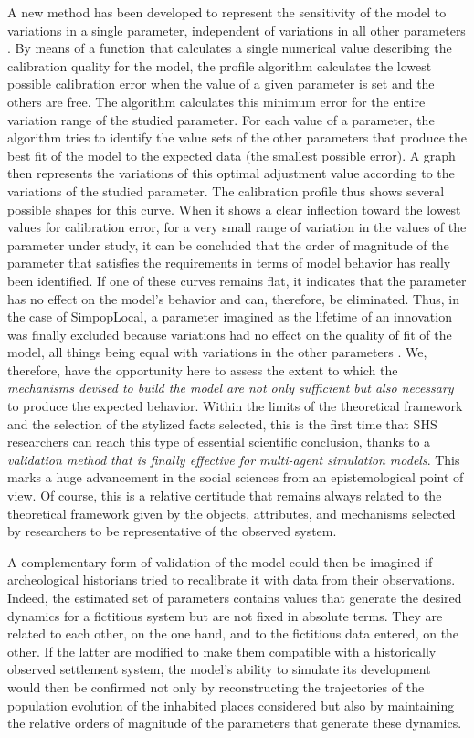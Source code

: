 \documentclass[10pt]{article}
\begin{document}
A new method has been developed to represent the sensitivity of the model to variations in a single parameter, independent of variations in all other parameters \citep{reuillon2015new}. By means of a function that calculates a single numerical value describing the calibration quality for the model, the profile algorithm calculates the lowest possible calibration error when the value of a given parameter is set and the others are free. The algorithm calculates this minimum error for the entire variation range of the studied parameter. For each value of a parameter, the algorithm tries to identify the value sets of the other parameters that produce the best fit of the model to the expected data (the smallest possible error). A graph then represents the variations of this optimal adjustment value according to the variations of the studied parameter. The calibration profile thus shows several possible shapes for this curve. When it shows a clear inflection toward the lowest values for calibration error, for a very small range of variation in the values of the parameter under study, it can be concluded that the order of magnitude of the parameter that satisfies the requirements in terms of model behavior has really been identified. If one of these curves remains flat, it indicates that the parameter has no effect on the model’s behavior and can, therefore, be eliminated. Thus, in the case of SimpopLocal, a parameter imagined as the lifetime of an innovation was finally excluded because variations had no effect on the quality of fit of the model, all things being equal with variations in the other parameters \citep{schmitt2014modelisation}. We, therefore, have the opportunity here to assess the extent to which the \textit{mechanisms devised to build the model are not only sufficient but also necessary} to produce the expected behavior. Within the limits of the theoretical framework and the selection of the stylized facts selected, this is the first time that SHS researchers can reach this type of essential scientific conclusion, thanks to a \textit{validation method that is finally effective for multi-agent simulation models}. This marks a huge advancement in the social sciences from an epistemological point of view. Of course, this is a relative certitude that remains always related to the theoretical framework given by the objects, attributes, and mechanisms selected by researchers to be representative of the observed system.

A complementary form of validation of the model could then be imagined if archeological historians tried to recalibrate it with data from their observations. Indeed, the estimated set of parameters contains values that generate the desired dynamics for a fictitious system but are not fixed in absolute terms. They are related to each other, on the one hand, and to the fictitious data entered, on the other. If the latter are modified to make them compatible with a historically observed settlement system, the model’s ability to simulate its development would then be confirmed not only by reconstructing the trajectories of the population evolution of the inhabited places considered but also by maintaining the relative orders of magnitude of the parameters that generate these dynamics.
\end{document}

